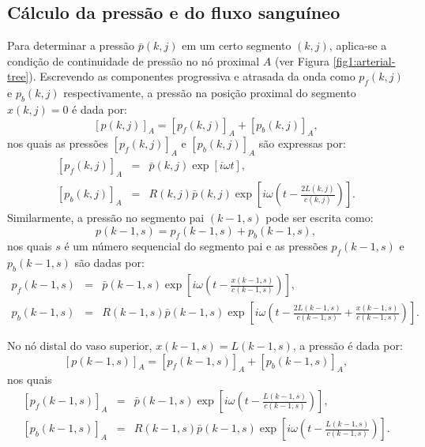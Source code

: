 \documentclass[a4paper,12pt]{monografia}
\theoremstyle{plain}
\theoremstyle{definition}
\theoremstyle{remark}
\begin{document}
\subsection{Cálculo da pressão e do fluxo sanguíneo}\label{sec:pressao-fluxo}

Para determinar a pressão $\bar{p} (k,j)$ em um certo segmento $(k,j)$, aplica-se a condição de continuidade de pressão no nó proximal $A$ (ver Figura \ref{fig1:arterial-tree}). Escrevendo as componentes progressiva e atrasada da onda como $p_f (k,j)$ e $p_b (k,j)$ respectivamente, a pressão na posição proximal do segmento  $x(k,j) = 0$ é dada por:
\begin{equation}
	\left[ p (k,j) \right]_A = \left[ p_f (k,j) \right]_A + \left[ p_b (k,j)\right]_A,
	\label{09_p}
\end{equation}
nos quais as pressões $\left[ p_f(k,j) \right]_A$ e $\left[ p_b(k,j) \right]_A$ são expressas por:
\begin{eqnarray}
	\left[ p_f(k,j) \right]_A &=& \bar{p}(k,j)\exp\left[ i\omega t\right],
	\label{10_p_f}\\
	\left[ p_b (k,j) \right]_A &=& R(k,j)\bar{p}(k,j)\exp\left[i\omega \left(t - \frac{2L(k,j)}{c(k,j)}\right) \right].
	\label{11_p_b}
\end{eqnarray}
Similarmente, a pressão no segmento pai $(k-1,s)$ pode ser escrita como:
\begin{equation}
	p(k-1,s) =  p_f(k-1,s) + p_b (k-1,s),
	\label{12_p|_f}
\end{equation}
nos quais $s$ é um número sequencial do segmento pai e as pressões $ p_f (k-1,s)$ e $p_b (k-1,s)$ são dadas por:
\begin{eqnarray}
	p_f (k-1,s) &=& \bar{p}(k-1,s)\exp\left[i\omega \left(t - \frac{x(k-1,s)}{c (k-1,s)}\right) \right],\\
	\label{13_p_f}
	p_b (k-1,s) &=& R (k-1,s)\bar{p}(k-1,s)\exp\left[ i\omega \left( t - \frac{2L(k-1,s)}{c(k-1,s)} + \frac{x(k-1,s)}{c(k-1,s)}\right) \right]. \nonumber
\end{eqnarray}

No nó distal do vaso superior, $x(k-1,s) = L(k-1,s)$, a pressão é dada por:
\begin{equation}
	\left[ p(k-1,s) \right]_A = \left[ p_f(k-1,s)\right]_A + \left[ p_b(k-1,s) \right]_A,
	\label{13_p|_f}
\end{equation}
nos quais 
\begin{eqnarray}
	\left[ p_f(k-1,s) \right]_A &=& \bar{p}(k-1,s)\exp\left[ i\omega \left(t - \frac{L(k-1,s)}{c(k-1,s)}\right)\right],
	\label{15_p_f}
	\\
	\left[ p_b(k-1,s) \right]_A &=& R(k-1,s)\bar{p}(k-1,s)\exp\left[i\omega \left( t - \frac{L(k-1,s)}{c(k-1,s)} \right) \right]. 
	\label{16_p_b}
\end{eqnarray}
\end{document}
